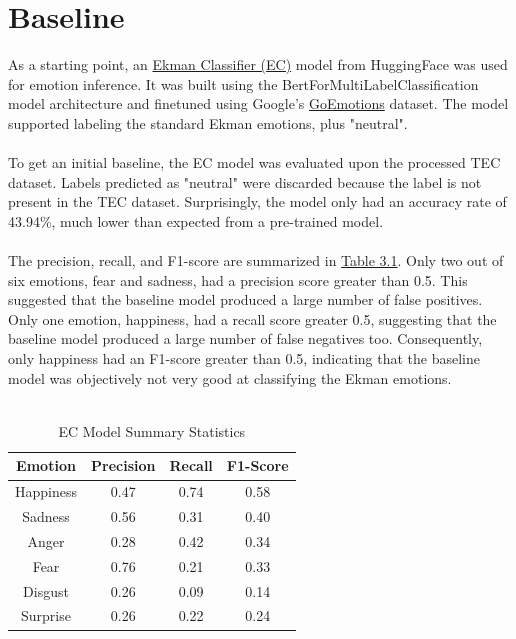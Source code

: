 \documentclass[11pt]{article}
\begin{document}
\section{Baseline}
As a starting point, an \href{https://huggingface.co/arpanghoshal/EkmanClassifier}{Ekman Classifier (EC)} model from HuggingFace was used for emotion inference. It was built using the BertForMultiLabelClassification model architecture and finetuned using Google's \href{https://huggingface.co/datasets/google-research-datasets/go_emotions}{GoEmotions} dataset. The model supported labeling the standard Ekman emotions, plus "neutral". \\ \\
To get an initial baseline, the EC model was evaluated upon the processed TEC dataset. Labels predicted as "neutral" were discarded because the label is not present in the TEC dataset. Surprisingly, the model only had an accuracy rate of 43.94\%, much lower than expected from a pre-trained model. \\ \\
The precision, recall, and F1-score are summarized in \hyperref[tab:baseline_summary_statistics]{Table 3.1}. Only two out of six emotions, fear and sadness, had a precision score greater than 0.5. This suggested that the baseline model produced a large number of false positives. Only one emotion, happiness, had a recall score greater 0.5, suggesting that the baseline model produced a large number of false negatives too. Consequently, only happiness had an F1-score greater than 0.5, indicating that the baseline model was objectively not very good at classifying the Ekman emotions. \\ \\
\renewcommand{\thetable}{3.1}
\begin{table}[h]
    	\centering
    	\begin{tabular}{c c c c}
        		\toprule
        		\textbf{Emotion} & \textbf{Precision} & \textbf{Recall} & \textbf{F1-Score} \\
        		\midrule
        		Happiness & 0.47 & 0.74 & 0.58 \\
        		Sadness & 0.56 & 0.31 & 0.40 \\
        		Anger & 0.28 & 0.42 & 0.34 \\
        		Fear & 0.76 & 0.21 & 0.33 \\
        		Disgust & 0.26 & 0.09 & 0.14 \\
        		Surprise & 0.26 & 0.22 & 0.24 \\
        		\bottomrule
    	\end{tabular}
    	\caption{EC Model Summary Statistics}
	\label{tab:baseline_summary_statistics}
\end{table}
\end{document}
